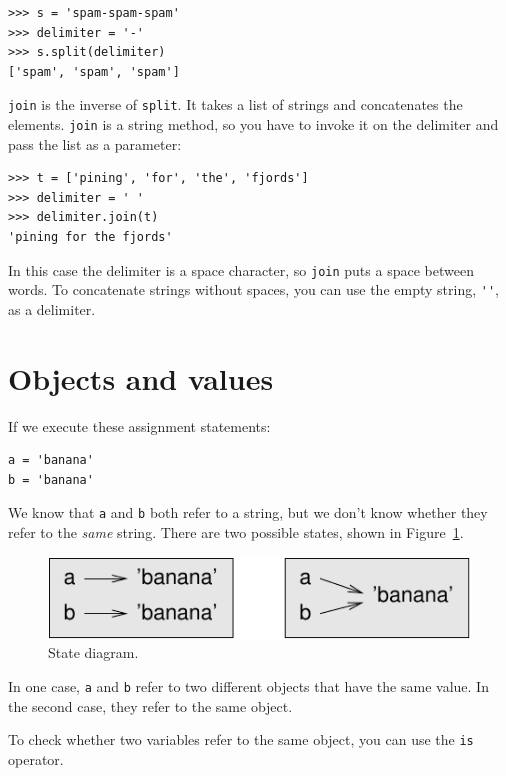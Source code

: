 \documentclass[10pt]{book}
\begin{document}
\begin{CJK}{UTF8}{gbsn}
\begin{verbatim}
>>> s = 'spam-spam-spam'
>>> delimiter = '-'
>>> s.split(delimiter)
['spam', 'spam', 'spam']
\end{verbatim}
%
{\tt join} is the inverse of {\tt split}.  It
takes a list of strings and
concatenates the elements.  {\tt join} is a string method,
so you have to invoke it on the delimiter and pass the
list as a parameter:

\begin{verbatim}
>>> t = ['pining', 'for', 'the', 'fjords']
>>> delimiter = ' '
>>> delimiter.join(t)
'pining for the fjords'
\end{verbatim}
%
In this case the delimiter is a space character, so
{\tt join} puts a space between words.  To concatenate
strings without spaces, you can use the empty string,
\verb"''", as a delimiter. 


\section{Objects and values}

If we execute these assignment statements:

\begin{verbatim}
a = 'banana'
b = 'banana'
\end{verbatim}
%
We know that {\tt a} and {\tt b} both refer to a
string, but we don't
know whether they refer to the {\em same} string.
There are two possible states, shown in Figure~\ref{fig.list1}.

\begin{figure}
\centerline
{\includegraphics[scale=0.8]{figs/list1.pdf}}
\caption{State diagram.}
\label{fig.list1}
\end{figure}


In one case, {\tt a} and {\tt b} refer to two different objects that
have the same value.  In the second case, they refer to the same
object.

To check whether two variables refer to the same object, you can
use the {\tt is} operator.


\end{CJK}
\end{document}
